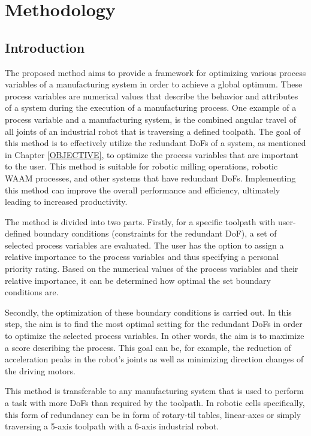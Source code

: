 \chapter{Methodology}\label{METmain}

\section{Introduction}%

The proposed method aims to provide a framework for optimizing various process variables of a manufacturing system in order to achieve a global optimum. These process variables are numerical values that describe the behavior and attributes of a system during the execution of a manufacturing process. One example of a process variable and a manufacturing system, is the combined angular travel of all joints of an industrial robot that is traversing a defined toolpath.
The goal of this method is to effectively utilize the redundant \acrshort{DoF}s of a system, as mentioned in Chapter \ref{OBJECTIVE}, to optimize the process variables that are important to the user. This method is suitable for robotic milling operations, robotic \acrshort{WAAM} processes, and other systems that have redundant \acrshort{DoF}s. Implementing this method can improve the overall performance and efficiency, ultimately leading to increased productivity.

The method is divided into two parts. Firstly, for a specific toolpath with user-defined boundary conditions (constraints for the redundant \acrshort{DoF}), a set of selected process variables are evaluated. 
The user has the option to assign a relative importance to the process variables and thus specifying a personal priority rating. Based on the numerical values of the process variables and their relative importance, it can be determined how optimal the set boundary conditions are.

Secondly, the optimization of these boundary conditions is carried out. In this step, the aim is to find the most optimal setting for the redundant \acrshort{DoF}s in order to optimize the selected process variables. In other words, the aim is to maximize a score describing the process. This goal can be, for example, the reduction of acceleration peaks in the robot's joints as well as minimizing direction changes of the driving motors.

This method is transferable to any manufacturing system that is used to perform a task with more \acrshort{DoF}s than required by the toolpath. In robotic cells specifically, this form of redundancy can be in form of rotary-til tables, linear-axes or simply traversing a 5-axis toolpath with a 6-axis industrial robot.  



